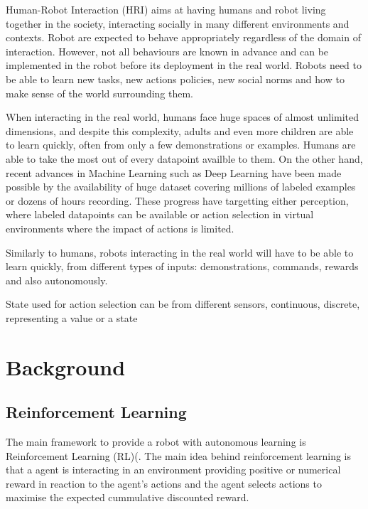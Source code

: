 \documentclass[letterpaper]{article} %
\begin{document}
Human-Robot Interaction (HRI) aims at having humans and robot living together
in the society, interacting socially in many different environments and
contexts. Robot are expected to behave appropriately regardless of the domain
of interaction. However, not all behaviours are known in advance and can be
implemented in the robot before its deployment in the real world. Robots need
to be able to learn new tasks, new actions policies, new social norms and how
to make sense of the world surrounding them.

When interacting in the real world, humans face huge spaces of almost unlimited
dimensions, and despite this complexity, adults and even more children are able
to learn quickly, often from only a few demonstrations or examples. Humans are
able to take the most out of every datapoint availble to them. On the other
hand, recent advances in Machine Learning such as Deep Learning \cite{lecun2015deep}
have been made possible by the availability of huge dataset covering millions
of labeled examples or dozens of hours recording. These progress have
targetting either perception, where labeled datapoints can be available or
action selection in virtual environments where the impact of actions is
limited.

Similarly to humans, robots interacting in the real world will have to be able
to learn quickly, from different types of inputs: demonstrations, commands,
rewards and also autonomously.


State used for action selection can be from different sensors, continuous, discrete, representing a value or a state

\cite{kober2013reinforcement}

\section{Background}
\subsection{Reinforcement Learning}

The main framework to provide a robot with autonomous learning is Reinforcement
Learning (RL)(\cite{kober2013reinforcement,sutton1998reinforcement}. The main idea
behind reinforcement learning is that a agent is interacting in an environment
providing positive or numerical reward in reaction to the agent's actions and
the agent selects actions to maximise the expected cummulative discounted
reward. 
\end{document}
